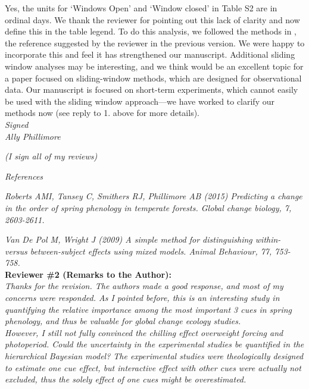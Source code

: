 \documentclass{article}
\begin{document}
Yes, the units for `Windows Open' and `Window closed' in Table S2 are in ordinal days. We thank the reviewer for pointing out this lack of clarity and now define this in the table legend. To do this analysis, we followed the methods in \citet{simmonds2019}, the reference suggested by the reviewer in the previous version. We were happy to incorporate this and feel it has strengthened our manuscript. Additional sliding window analyses may be interesting, and we think would be an excellent topic for a paper focused on sliding-window methods, which are designed for observational data. Our manuscript is focused on short-term experiments, which cannot easily be used with the sliding window approach---we have worked to clarify our methods now (see reply to 1. above for more details).\\

 \emph{Signed}\\
 \emph{Ally Phillimore}

 \emph{(I sign all of my reviews)}

 \emph{References}

\emph{Roberts AMI, Tansey C, Smithers RJ, Phillimore AB (2015) Predicting a change in the order of spring
phenology in temperate forests. Global change biology, 7, 2603-2611.}

 \emph{Van De Pol M, Wright J (2009) A simple method for distinguishing within- versus between-subject effects
using mixed models. Animal Behaviour, 77, 753-758.}\\
{\bf Reviewer \#2 (Remarks to the Author):}\\

\emph{Thanks for the revision. The authors made a good response, and most of my concerns were responded. As I pointed before, this is an interesting study in quantifying the relative importance among the most important 3 cues in spring phenology, and thus be valuable for global change ecology studies. }\\


\emph{However, I still not fully convinced the chilling effect overweight forcing and photoperiod. Could the uncertainty in the experimental studies be quantified in the hierarchical Bayesian model? The experimental studies were theologically designed to estimate one cue effect, but interactive effect with other cues were actually not excluded, thus the solely effect of one cues might be overestimated.}\\ 

\end{document}
